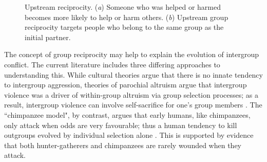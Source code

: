 \documentclass[12pt,a4paper]{article}\usepackage[]{graphicx}\usepackage[]{color}
\begin{document}
\begin{figure}
\begin{center}
\begin{subfigure}[b]{0.4\textwidth}
            \caption{}\label{group}
        \end{subfigure}
        \caption{Upstream reciprocity. (\textit{a}) Someone who was helped or harmed becomes more likely to help or harm others. (\textit{b})
    Upstream group reciprocity targets people who belong to
    the same group as the initial partner.}
        \label{fig:illustration}
	\end{center}
\end{figure}

The concept of group reciprocity may help to explain the evolution of intergroup conflict. The current literature 
includes three differing approaches to understanding this. While cultural theories argue that there is no innate tendency to 
intergroup aggression, theories of parochial altruism argue that intergroup violence was a driver of within-group 
altruism via group selection processes; as a result, intergroup violence can involve self-sacrifice for one's group
members \citep{choi2007coevolution,bowles2009did}. The ``chimpanzee model", by contrast, argues that early humans, like
chimpanzees, only attack when odds are very favourable; thus a human tendency to kill outgroups evolved by individual
selection alone \citep{wrangham2012intergroup}. This is supported by evidence that both 
hunter-gatherers and chimpanzees are rarely wounded when they attack. 
\end{document}

